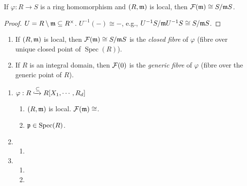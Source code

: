 \begin{proposition}
    If $\varphi:R \to S$ is a ring homomorphism and $(R,\mathfrak{m})$ is local, then $\mathcal{F}(\mathfrak{m}) \cong S/\mathfrak{m} S$.
\end{proposition}

\begin{proof}
    $U = R \setminus \mathfrak{m} \subseteq R^\times$. $U^{-1}(-) \cong -$, e.g., $U^{-1}S/\mathfrak{m} U^{-1}S \cong S/\mathfrak{m} S$.
\end{proof}

\begin{definition}
    \begin{enumerate}
        \item If $(R,\mathfrak{m})$ is local, then $\mathcal{F}(\mathfrak{m}) \cong S/\mathfrak{m} S$ is the \emph{closed fibre} of $\varphi$ (fibre over unique closed point of $\operatorname{Spec}(R)$).
        \item 
            If $R$ is an integral domain, then $\mathcal{F}(0)$ is the \emph{generic fibre} of $\varphi$ (fibre over the generic point of $R$).
    \end{enumerate}
\end{definition}

\begin{example}
    \begin{enumerate}
        \item $\varphi: R \xhookrightarrow \subseteq R[X_1,\cdots,R_d]$
            \begin{enumerate}
                \item $(R,\mathfrak{m})$ is local. $\mathcal{F}(\mathfrak{m}) \cong $.
                \item $\mathfrak{p} \in \operatorname{Spec}(R)$.
            \end{enumerate}
        \item 
            \begin{enumerate}
                \item
            \end{enumerate}
        \item
            \begin{enumerate}
                \item 
                \item 
            \end{enumerate}
    \end{enumerate}
\end{example}
